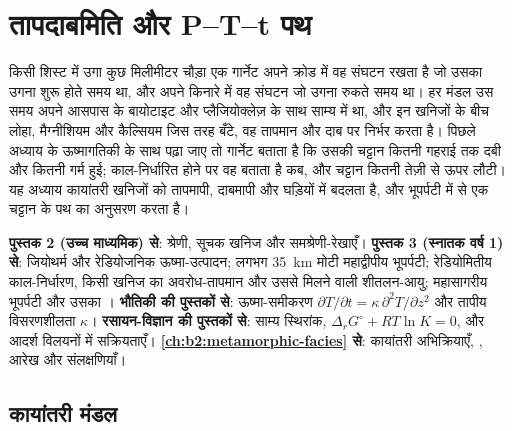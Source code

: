 \chapter{तापदाबमिति और P--T--t पथ}\label{ch:b2:pt-paths}

किसी शिस्ट में उगा कुछ मिलीमीटर चौड़ा एक गार्नेट अपने क्रोड में वह संघटन रखता है
जो उसका उगना शुरू होते समय था, और अपने किनारे में वह संघटन जो उगना रुकते समय था। हर
मंडल उस समय अपने आसपास के बायोटाइट और प्लैजियोक्लेज़ के साथ साम्य में था, और
इन खनिजों के बीच लोहा, मैग्नीशियम और कैल्सियम जिस तरह बँटे, वह तापमान
और दाब पर निर्भर करता है। पिछले अध्याय के ऊष्मागतिकी के साथ पढ़ा जाए तो गार्नेट बताता है कि
उसकी चट्टान कितनी गहराई तक दबी और कितनी गर्म हुई; काल-निर्धारित होने पर वह बताता है कब, और
चट्टान कितनी तेज़ी से ऊपर लौटी। यह अध्याय कायांतरी खनिजों को तापमापी, दाबमापी
और घड़ियों में बदलता है, और भूपर्पटी में से एक चट्टान के पथ का अनुसरण करता है।

\begin{recall}
\textbf{पुस्तक 2 (उच्च माध्यमिक) से}:  श्रेणी, सूचक खनिज और समश्रेणी-रेखाएँ।
\textbf{पुस्तक 3 (स्नातक वर्ष 1) से}: जियोथर्म और रेडियोजनिक ऊष्मा-उत्पादन; लगभग
\qty{35}{km} मोटी महाद्वीपीय भूपर्पटी; रेडियोमितीय काल-निर्धारण, किसी खनिज का अवरोध-तापमान
और उससे मिलने वाली शीतलन-आयु; महासागरीय भूपर्पटी और उसका ।
\textbf{भौतिकी की पुस्तकों से}: ऊष्मा-समीकरण $\partial T/\partial t = \kappa\,
\partial^2 T/\partial z^2$ और तापीय विसरणशीलता $\kappa$। \textbf{रसायन-विज्ञान की
पुस्तकों से}: साम्य स्थिरांक, $\Delta_r G^\circ + RT\ln K = 0$, और आदर्श विलयनों में
सक्रियताएँ। \textbf{\cref{ch:b2:metamorphic-facies} से}: कायांतरी अभिक्रियाएँ,
,  आरेख और संलक्षणियाँ।
\end{recall}

\section{कायांतरी मंडल}\label{sec:b2:pt-paths:zones}

